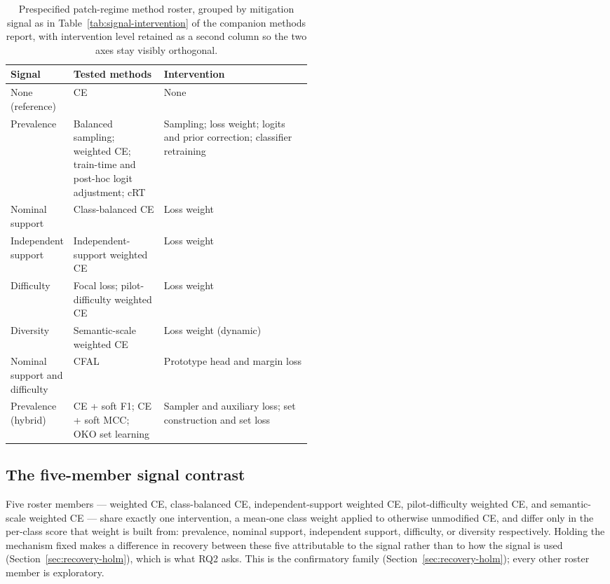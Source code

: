 \documentclass[11pt]{article}
\begin{document}
\begin{table}[ht]
  \centering
  \footnotesize
  \begin{tabularx}{\linewidth}{@{}>{\raggedright\arraybackslash}p{0.20\linewidth}>{\raggedright\arraybackslash}p{0.30\linewidth}X@{}}
    \toprule
    Signal & Tested methods & Intervention \\
    \midrule
    None (reference) & CE & None \\
    Prevalence & Balanced sampling; weighted CE; train-time and post-hoc logit adjustment; cRT & Sampling; loss weight; logits and prior correction; classifier retraining \\
    Nominal support & Class-balanced CE & Loss weight \\
    Independent support & Independent-support weighted CE & Loss weight \\
    Difficulty & Focal loss; pilot-difficulty weighted CE & Loss weight \\
    Diversity & Semantic-scale weighted CE & Loss weight (dynamic) \\
    Nominal support and difficulty & CFAL & Prototype head and margin loss \\
    Prevalence (hybrid) & CE + soft F1; CE + soft MCC; OKO set learning & Sampler and auxiliary loss; set construction and set loss \\
    \bottomrule
  \end{tabularx}
  \caption{Prespecified patch-regime method roster, grouped by mitigation signal as in Table~\ref{tab:signal-intervention} of the companion methods report, with intervention level retained as a second column so the two axes stay visibly orthogonal.}
  \label{tab:roster}
\end{table}

\subsection{The five-member signal contrast}
\label{sec:five-family}
Five roster members --- weighted CE, class-balanced CE, independent-support weighted CE, pilot-difficulty weighted CE, and semantic-scale weighted CE --- share exactly one intervention, a mean-one class weight applied to otherwise unmodified CE, and differ only in the per-class score that weight is built from: prevalence, nominal support, independent support, difficulty, or diversity respectively. Holding the mechanism fixed makes a difference in recovery between these five attributable to the signal rather than to how the signal is used (Section~\ref{sec:recovery-holm}), which is what RQ2 asks. This is the confirmatory family (Section~\ref{sec:recovery-holm}); every other roster member is exploratory.
\end{document}
